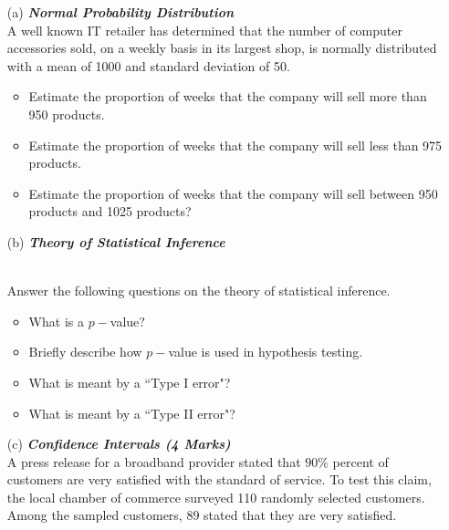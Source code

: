 \begin{itemize}

\item[(a)] \textbf{\textit{Normal Probability Distribution }}\\
A well known IT retailer has determined that the number of computer accessories sold, on a weekly basis in its largest 
shop, is normally distributed with a mean of 1000 and standard deviation of 50.
\begin{itemize}

\item  Estimate the proportion of weeks that the company will sell more than 950 products.


\item  Estimate the proportion of weeks that the company will sell less than 975 products.

\item  Estimate the proportion of weeks that the company will sell between 950 products and 1025 products?
\end{itemize}


\item[(b)] \textbf{\textit{Theory of Statistical Inference }}

\\Answer the following questions on the theory of statistical inference.
\begin{itemize}

\item  What is a $p-$value?

\item  Briefly describe how $p-$value is used in hypothesis testing.

\item  What is meant by a ``Type I error"?

\item   What is meant by a ``Type II error"?
\end{itemize}
\bigskip


\item[(c)] \textbf{\textit{Confidence Intervals (4 Marks)}}\\
A press release for a broadband provider stated that $90\%$ percent of customers are very satisfied
with the standard of service. To test this claim, the local chamber of commerce surveyed 110 randomly selected customers. 
Among the sampled customers, 89 stated that they are very satisfied.



\end{itemize}
